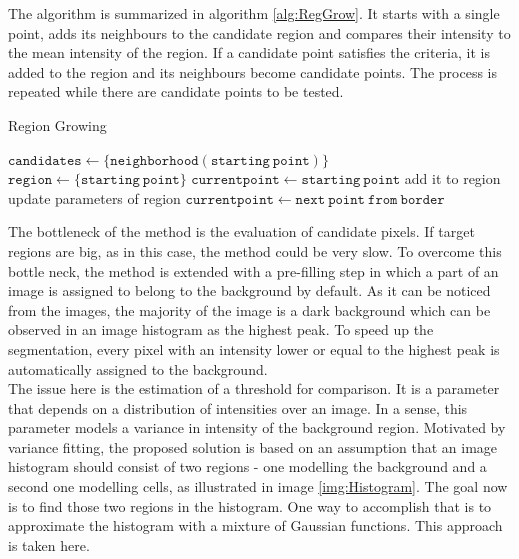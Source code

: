 The algorithm is summarized in algorithm \ref{alg:RegGrow}. It starts with a single point, adds its neighbours to the candidate region and compares their intensity to the mean intensity of the region. If a candidate point satisfies the criteria, it is added to the region and its neighbours become candidate points. The process is repeated while there are candidate points to be tested. \\

\begin{algorithm}
\caption{Region Growing }
  \label{alg:RegGrow}
\begin{algorithmic}[1]
 \State $\mathtt{candidates} \gets \{ \mathtt{neighborhood}(\mathtt{starting \ point}) \}$
 \State $\mathtt{region} \gets \{ \mathtt{starting \ point} \}$
 \State $\mathtt{current point} \gets \mathtt{starting \ point}$
 			\State add it to region
 			\State update parameters of region
 		\EndIf 
 	\EndFor
 	\State $\mathtt{current point} \gets \mathtt{next \ point \ from \ border}$
 \EndWhile
 \EndFunction
\end{algorithmic}
\end{algorithm}

The bottleneck of the method is the evaluation of candidate pixels. If target regions are big, as in this case, the method could be very slow. To overcome this bottle neck, the method is extended with a pre-filling step in which a part of an image is assigned to belong to the background by default. As it can be noticed from the images, the majority of the image is a dark background which can be observed in an image histogram as the highest peak. To speed up the segmentation, every pixel with an intensity lower or equal to the highest peak is automatically assigned to the  background.   \\

The issue here is the estimation of a threshold for comparison. It is a parameter that depends on a distribution of intensities over an image. In a sense, this parameter models a variance in intensity of the background region. Motivated by variance fitting, the proposed solution is based on an assumption that an image histogram should consist of two regions - one modelling the background and a second one modelling cells, as illustrated in image \ref{img:Histogram}. The goal now is to find those two regions in the histogram. One way to accomplish that is to approximate the histogram with a mixture of Gaussian functions. This approach is taken here.  

